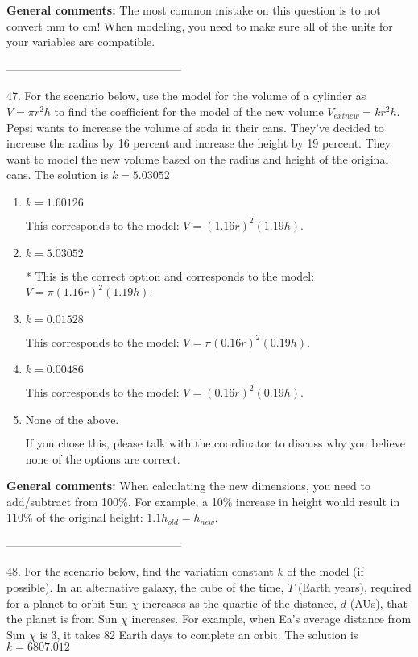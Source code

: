 \documentclass{extbook}[14pt]
\begin{document}
\textbf{General comments:} The most common mistake on this question is to not convert mm to cm! When modeling, you need to make sure all of the units for your variables are compatible.

-----------------------------------------------

47. For the scenario below, use the model for the volume of a cylinder as $V = \pi r^2 h$ to find the coefficient for the model of the new volume $V_{	ext{new}} = k r^2 h$.
Pepsi wants to increase the volume of soda in their cans. They've decided to increase the radius by 16 percent and increase the height by 19 percent. They want to model the new volume based on the radius and height of the original cans. 
The solution is $ k = 5.03052 $ 

\begin{enumerate}[label=\Alph*.] 
\item $ k = 1.60126 $ 

 This corresponds to the model: $V = (1.16 r)^2 (1.19 h)$. 
\item $ k = 5.03052 $ 

 * This is the correct option and corresponds to the model: $V = \pi (1.16 r)^2 (1.19 h)$. 
\item $ k = 0.01528 $ 

 This corresponds to the model: $V = \pi (0.16 r)^2 (0.19 h)$. 
\item $ k = 0.00486 $ 

 This corresponds to the model: $V = (0.16 r)^2 (0.19 h)$. 
\item $ \text{None of the above.} $ 

 If you chose this, please talk with the coordinator to discuss why you believe none of the options are correct. 
\end{enumerate} 
 
\textbf{General comments:} When calculating the new dimensions, you need to add/subtract from 100\%. For example, a 10\% increase in height would result in 110\% of the original height: $1.1h_{old} = h_{new}$.

-----------------------------------------------

48. For the scenario below, find the variation constant $k$ of the model (if possible).
In an alternative galaxy, the cube of the time, $T$ (Earth years), required for a planet to orbit Sun $\chi$ increases as the quartic of the distance, $d$ (AUs), that the planet is from Sun $\chi$ increases. For example, when Ea's average distance from Sun $\chi$ is 3, it takes 82 Earth days to complete an orbit. 
The solution is $ k = 6807.012 $ 
\end{document}
